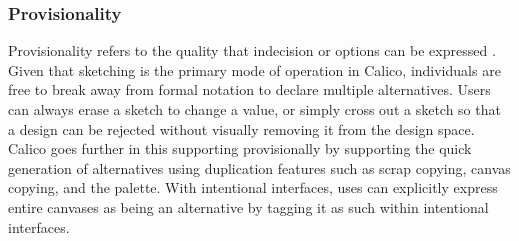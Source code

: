 \documentclass[12pt,fleqn]{ucithesis}
\begin{document}

\subsubsection{Provisionality}
Provisionality refers to the quality that indecision or options can be expressed \cite{Petre2013BookChapter}. Given that sketching is the primary mode of operation in Calico, individuals are free to break away from formal notation to declare multiple alternatives. Users can always erase a sketch to change a value, or simply cross out a sketch so that a design can be rejected without visually removing it from the design space. Calico goes further in this supporting provisionally by supporting the quick generation of alternatives using duplication features such as scrap copying, canvas copying, and the palette. With intentional interfaces, uses can explicitly express entire canvases as being an alternative by tagging it as such within intentional interfaces.


\end{document}
